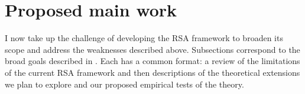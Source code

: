 \section{Proposed main work}
\label{sec:proposed}

I now take up the challenge of developing the RSA framework to
broaden its scope and address the weaknesses described above.
Subsections correspond to the broad goals described in
. Each has a common format: a review of the
limitations of the current RSA framework and then descriptions of the
theoretical extensions we plan to explore and our proposed empirical
tests of the theory.


